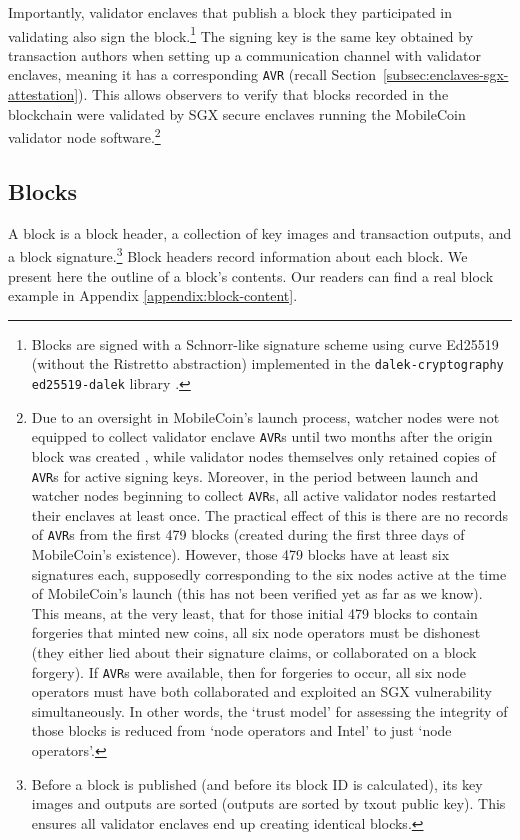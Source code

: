 Importantly, validator enclaves that publish a block they participated in validating also sign the block.\footnote{Blocks are signed with a Schnorr-like signature scheme using curve Ed25519 (without the Ristretto abstraction) implemented in the {\tt dalek-cryptography ed25519-dalek} library \cite{dalek-ed25519-lib}.} The signing key is the same key obtained by transaction authors when setting up a communication channel with validator enclaves, meaning it has a corresponding {\tt AVR} (recall Section~\ref{subsec:enclaves-sgx-attestation}). This allows observers to verify that blocks recorded in the blockchain were validated by SGX secure enclaves running the MobileCoin validator node software.\footnote{Due to an oversight in MobileCoin's launch process, watcher nodes were not equipped to collect validator enclave {\tt AVR}s until two months after the origin block was created \cite{mc-pull-request-watcher-logs-avrs}, while validator nodes themselves only retained copies of {\tt AVR}s for active signing keys. Moreover, in the period between launch and watcher nodes beginning to collect {\tt AVR}s, all active validator nodes restarted their enclaves at least once. The practical effect of this is there are no records of {\tt AVR}s from the first 479 blocks (created during the first three days of MobileCoin's existence). However, those 479 blocks have at least six signatures each, supposedly corresponding to the six nodes active at the time of MobileCoin's launch (this has not been verified yet as far as we know). This means, at the very least, that for those initial 479 blocks to contain forgeries that minted new coins, all six node operators must be dishonest (they either lied about their signature claims, or collaborated on a block forgery). If {\tt AVR}s were available, then for forgeries to occur, all six node operators must have both collaborated and exploited an SGX vulnerability simultaneously. In other words, the `trust model' for assessing the integrity of those blocks is reduced from `node operators and Intel' to just `node operators'.}%


\subsection{Blocks}
\label{subsec:blocks}

A block is a block header, a collection of key images and transaction outputs, and a block signature.\footnote{Before a block is published (and before its block ID is calculated), its key images and outputs are sorted (outputs are sorted by txout public key). This ensures all validator enclaves end up creating identical blocks.} Block headers record information about each block. We present here the outline of a block's contents. Our readers can find a real block example in Appendix \ref{appendix:block-content}.

